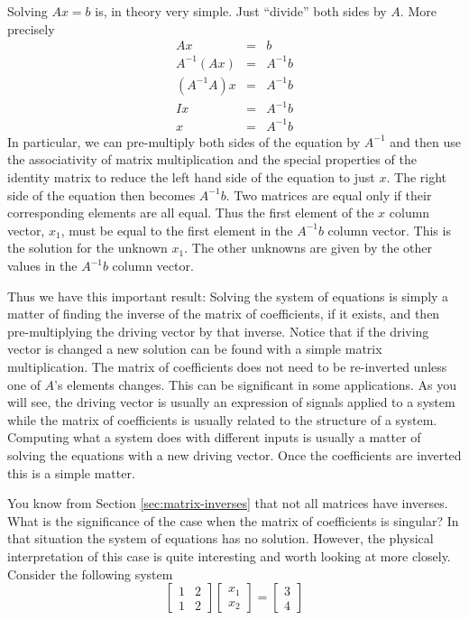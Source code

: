 Solving $Ax = b$ is, in theory very simple. Just ``divide'' both sides by $A$. More precisely
\begin{eqnarray*}
  Ax         & = & b       \\
  A^{-1}(Ax) & = & A^{-1}b \\
  (A^{-1}A)x & = & A^{-1}b \\
  Ix         & = & A^{-1}b \\
  x          & = & A^{-1}b
\end{eqnarray*}
In particular, we can pre-multiply both sides of the equation by $A^{-1}$ and then use the
associativity of matrix multiplication and the special properties of the identity matrix to
reduce the left hand side of the equation to just $x$. The right side of the equation then
becomes $A^{-1}b$. Two matrices are equal only if their corresponding elements are all equal.
Thus the first element of the $x$ column vector, $x_1$, must be equal to the first element in
the $A^{-1}b$ column vector. This is the solution for the unknown $x_1$. The other unknowns are
given by the other values in the $A^{-1}b$ column vector.

Thus we have this important result: Solving the system of equations is simply a matter of
finding the inverse of the matrix of coefficients, if it exists, and then pre-multiplying the
driving vector by that inverse. Notice that if the driving vector is changed a new solution can
be found with a simple matrix multiplication. The matrix of coefficients does not need to be
re-inverted unless one of $A$'s elements changes. This can be significant in some applications.
As you will see, the driving vector is usually an expression of signals applied to a system
while the matrix of coefficients is usually related to the structure of a system. Computing what
a system does with different inputs is usually a matter of solving the equations with a new
driving vector. Once the coefficients are inverted this is a simple matter.

You know from Section \ref{sec:matrix-inverses} that not all matrices have inverses. What is the
significance of the case when the matrix of coefficients is singular? In that situation the
system of equations has no solution. However, the physical interpretation of this case is quite
interesting and worth looking at more closely. Consider the following system
\begin{displaymath}
\left[
\begin{array}{cc}
 1 & 2 \\
 1 & 2
\end{array}
\right]
\left[
\begin{array}{cc}
x_1 \\
x_2
\end{array}
\right] =
\left[
\begin{array}{cc}
3 \\
4
\end{array}
\right]
\end{displaymath}

